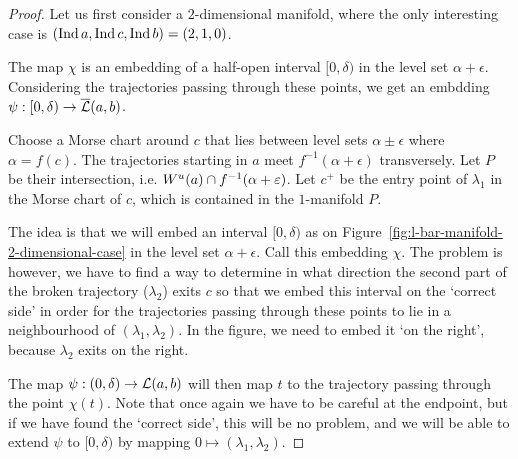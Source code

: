 \begin{proof}
    Let us first consider a $2$-dimensional manifold, where the only interesting case is $(\operatorname{Ind} a, \operatorname{Ind} c, \operatorname{Ind} b) = (2,1,0)$.

    \begin{marginfigure}
        \centering
        \caption{The map $\chi$ is an embedding of a half-open interval $[0, \delta)$ in the level set $\alpha+ \epsilon$. Considering the trajectories passing through these points, we get an embdding $\psi: [0, \delta) \to \overline{\mathcal L}(a, b)$.}
        \label{fig:l-bar-manifold-2-dimensional-case}
    \end{marginfigure}
    Choose a Morse chart around $c$ that lies between level sets $\alpha \pm \epsilon$ where  $\alpha = f(c)$.
    The trajectories starting in $a$ meet $f^{-1}(\alpha + \epsilon)$ transversely.
    Let $P$ be their intersection, i.e. $W^u(a) \cap  f^{-1}( \alpha + \varepsilon)$.
    Let $c^{+}$ be the entry point of $\lambda_1$ in  the Morse chart of $c$, which is contained in the $1$-manifold $P$.

    The idea is that we will embed an interval $[0, \delta)$ as on Figure~\ref{fig:l-bar-manifold-2-dimensional-case} in the level set $\alpha + \epsilon$. Call this embedding $\chi$.
    The problem is however, we have to find a way to determine in what direction the second part of the broken trajectory ($\lambda_2$) exits $c$ so that we embed this interval on the `correct side' in order for the trajectories passing through these points to lie in a neighbourhood of $(\lambda_1, \lambda_2)$.
    In the figure, we need to embed it `on the right', because $\lambda_2$ exits on the right.

    The map $\psi:(0, \delta) \to  \mathcal L(a, b)$ will then map $t$ to the trajectory passing through the point $\chi(t)$.
    Note that once again we have to be careful at the endpoint, but if we have found the `correct side', this will be no problem, and we will be able to extend $\psi$ to $[0, \delta)$ by mapping  $0 \mapsto (\lambda_1, \lambda_2)$.


\end{proof}
